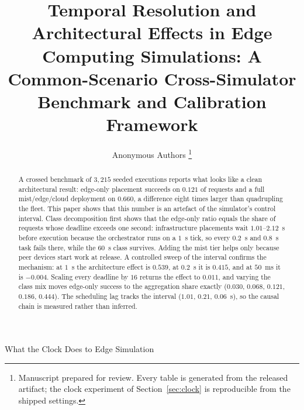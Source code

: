 \documentclass[journal,10pt]{IEEEtran}
\begin{document}
\title{Temporal Resolution and Architectural Effects in Edge Computing
Simulations: A Common-Scenario Cross-Simulator Benchmark and Calibration Framework}

\author{Anonymous Authors%
\thanks{Manuscript prepared for review. Every table is generated from the
released artifact; the clock experiment of Section~\ref{sec:clock} is
reproducible from the shipped settings.}}

%
{What the Clock Does to Edge Simulation}

\maketitle

\begin{abstract}
A crossed benchmark of $3{,}215$ seeded executions reports what looks like a
clean architectural result: edge-only placement succeeds on $0.121$ of requests
and a full mist/edge/cloud deployment on $0.660$, a difference eight times
larger than quadrupling the fleet. This paper shows that this number is an
artefact of the simulator's control interval. Class decomposition first shows
that the edge-only ratio equals the share of requests whose deadline exceeds one
second: infrastructure placements wait $1.01$--$2.12$~s before execution because
the orchestrator runs on a $1$~s tick, so every $0.2$~s and $0.8$~s task fails
there, while the $60$~s class survives. Adding the mist tier helps only because
peer devices start work at release. A controlled sweep of the interval confirms
the mechanism: at $1$~s the architecture effect is $0.539$, at $0.2$~s it is
$0.415$, and at $50$~ms it is $-0.004$. Scaling every deadline by $16$ returns
the effect to $0.011$, and varying the class mix moves edge-only success to the
aggregation share exactly ($0.030$, $0.068$, $0.121$, $0.186$, $0.444$). The
scheduling lag tracks the interval ($1.01$, $0.21$, $0.06$~s), so the causal
chain is measured rather than inferred.


\end{abstract}
\end{document}
